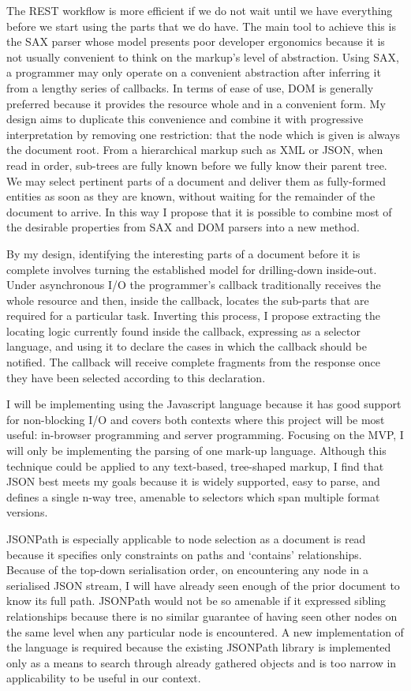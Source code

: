 \documentclass[12pt, ]{article}
\begin{document}
The REST workflow is more efficient if we do not wait until we have
everything before we start using the parts that we do have. The main
tool to achieve this is the SAX parser whose model presents poor
developer ergonomics because it is not usually convenient to think on
the markup's level of abstraction. Using SAX, a programmer may only
operate on a convenient abstraction after inferring it from a lengthy
series of callbacks. In terms of ease of use, DOM is generally preferred
because it provides the resource whole and in a convenient form. My
design aims to duplicate this convenience and combine it with
progressive interpretation by removing one restriction: that the node
which is given is always the document root. From a hierarchical markup
such as XML or JSON, when read in order, sub-trees are fully known
before we fully know their parent tree. We may select pertinent parts of
a document and deliver them as fully-formed entities as soon as they are
known, without waiting for the remainder of the document to arrive. In
this way I propose that it is possible to combine most of the desirable
properties from SAX and DOM parsers into a new method.

By my design, identifying the interesting parts of a document before it
is complete involves turning the established model for drilling-down
inside-out. Under asynchronous I/O the programmer's callback
traditionally receives the whole resource and then, inside the callback,
locates the sub-parts that are required for a particular task. Inverting
this process, I propose extracting the locating logic currently found
inside the callback, expressing as a selector language, and using it to
declare the cases in which the callback should be notified. The callback
will receive complete fragments from the response once they have been
selected according to this declaration.

I will be implementing using the Javascript language because it has good
support for non-blocking I/O and covers both contexts where this project
will be most useful: in-browser programming and server programming.
Focusing on the MVP, I will only be implementing the parsing of one
mark-up language. Although this technique could be applied to any
text-based, tree-shaped markup, I find that JSON best meets my goals
because it is widely supported, easy to parse, and defines a single
n-way tree, amenable to selectors which span multiple format versions.

JSONPath is especially applicable to node selection as a document is
read because it specifies only constraints on paths and `contains'
relationships. Because of the top-down serialisation order, on
encountering any node in a serialised JSON stream, I will have already
seen enough of the prior document to know its full path. JSONPath would
not be so amenable if it expressed sibling relationships because there
is no similar guarantee of having seen other nodes on the same level
when any particular node is encountered. A new implementation of the
language is required because the existing JSONPath library is
implemented only as a means to search through already gathered objects
and is too narrow in applicability to be useful in our context.
\end{document}
